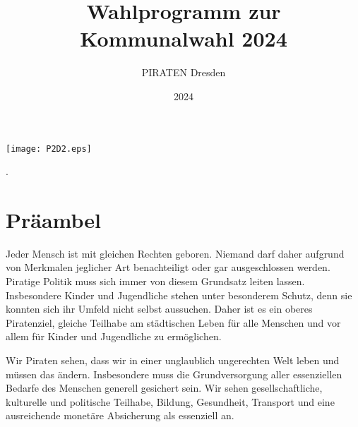 \documentclass[a4paper, 11pt]{article}
\begin{document}
\title{\Huge{\bf{Wahlprogramm zur \\ Kommunalwahl 2024}}}

\author{\Huge{PIRATEN Dresden}}
\date{\Large{2024}}
\maketitle
\thispagestyle{empty}

\vspace*{8cm}\hspace*{3cm}\texttt{[image: P2D2.eps]}%
\newpage


\thispagestyle{empty}
.

\newpage
\clearpage
{}
\tableofcontents

\newpage

\section{Präambel}
Jeder Mensch ist mit gleichen Rechten geboren. Niemand darf daher aufgrund von Merkmalen jeglicher Art benachteiligt oder gar ausgeschlossen werden. Piratige Politik muss sich immer von diesem Grundsatz leiten lassen. Insbesondere Kinder und Jugendliche stehen unter besonderem Schutz, denn sie konnten sich ihr Umfeld nicht selbst aussuchen. Daher ist es ein oberes Piratenziel, gleiche Teilhabe am städtischen Leben für alle Menschen und vor allem für Kinder und Jugendliche zu ermöglichen.\newline
\vspace*{0.25cm}

Wir Piraten sehen, dass wir in einer unglaublich ungerechten Welt leben und müssen das ändern. Insbesondere muss die Grundversorgung aller essenziellen Bedarfe des Menschen generell gesichert sein. Wir sehen gesellschaftliche, kulturelle und politische Teilhabe, Bildung, Gesundheit, Transport und eine ausreichende monetäre Absicherung als essenziell an.\newline
\vspace*{0.25cm}
\end{document}
